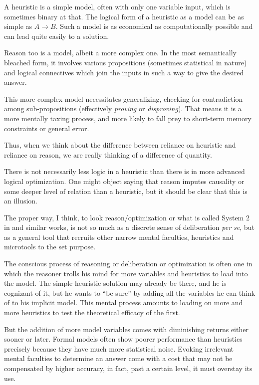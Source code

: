 \documentclass{article}
\begin{document}
A heuristic is a simple model, often with only one variable input, which is sometimes binary at that.
The logical form of a heuristic as a model can be as simple as $A{\rightarrow}B$.
Such a model is as economical as computationally possible and can lead quite easily to a solution.

Reason too is a model, albeit a more complex one.
In the most semantically bleached form, it involves various propositions (sometimes statistical in nature) and logical connectives which join the inputs in such a way to give the desired answer.

This more complex model necessitates generalizing, checking for contradiction among sub-propositions (effectively \textit{proving} or \textit{disproving}).
That means it is a more mentally taxing process, and more likely to fall prey to short-term memory constraints or general error.

Thus, when we think about the difference between reliance on heuristic and reliance on reason, we are really thinking of a difference of quantity.

There is not necessarily less logic in a heuristic than there is in more advanced logical optimization.
One might object saying that reason imputes causality or some deeper level of relation than a heuristic, but it should be clear that this is an illusion.

The proper way, I think, to look reason/optimization or what is called System 2 in \textcite{kahneman11} and similar works, is not so much as a discrete sense of deliberation \emph{per se}, but as a general tool that recruits other narrow mental faculties, heuristics and microtools to the set purpose.

The conscious process of reasoning or deliberation or optimization is often one in which the reasoner trolls his mind for more variables and heuristics to load into the model.
The simple heuristic solution may already be there, and he is cognizant of it, but he wants to ``be sure'' by adding all the variables he can think of to his implicit model.
This mental process amounts to loading on more and more heuristics to test the theoretical efficacy of the first.

But the addition of more model variables comes with diminishing returns either sooner or later.
Formal models often show poorer performance than heuristics precisely because they have much more statistical noise.
Evoking irrelevant mental faculties to determine an answer come with a cost that may not be compensated by higher accuracy, in fact, past a certain level, it must overstay its use.
\end{document}
